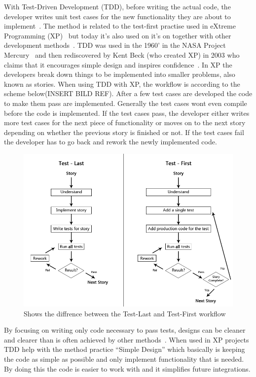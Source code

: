 With Test-Driven Development (TDD), before writing the actual code, the developer writes unit test cases for the new functionality they are about to implement~\cite{beckTestDriven}. The method is related to the test-first practise used in eXtreme Programming (XP)~\cite{beckXP} but today it’s also used on it’s on together with other development methods~\cite{MSNET}. TDD was used in the 1960’ in the NASA Project Mercury~\cite{NASA} and then rediscovered by Kent Beck (who created XP) in 2003 who claims that it encourages simple design and inspires confidence~\cite{beckXP}. In XP the developers break down things to be implemented into smaller problems, also known as stories. When using TDD with XP, the workflow is according to the scheme below(INSERT BILD REF). After a few test cases are developed the code to make them pass are implemented. Generally the test cases wont even compile before the code is implemented. If the test cases pass, the developer either writes more test cases for the next piece of functionality or moves on to the next story depending on whether the previous story is finished or not. If the test cases fail the developer has to go back and rework the newly implemented code.

\begin{figure}
\begin{center}
\includegraphics[scale=0.60]{tdd.png}
\caption{Shows the diffrence between the Test-Last and Test-First workflow}
\end{center}
\end{figure}


By focusing on writing only code necessary to pass tests, designs can be cleaner and clearer than is often achieved by other methods~\cite{beckXP}. When used in XP projects TDD help with the method practice “Simple Design” which basically is keeping the code as simple as possible and only implement functionality that is needed. By doing this the code is easier to work with and it simplifies future integrations. 



